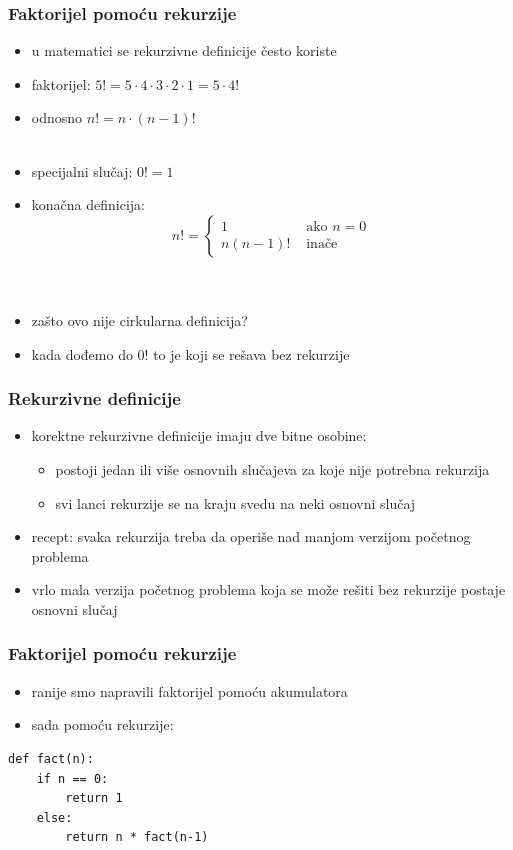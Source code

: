 \documentclass[utf8,compress]{beamer}
\begin{document}
\begin{frame}[fragile]
  \frametitle{Faktorijel pomoću rekurzije}
  \begin{itemize}
    \item u matematici se rekurzivne definicije često koriste
    \item faktorijel: $5! = 5\cdot 4\cdot 3\cdot 2\cdot 1 = 5\cdot 4!$
    \item odnosno $n! = n\cdot (n-1)!$ \\ \ \\
    \item specijalni slučaj: $0! = 1$
    \item konačna definicija: \\
    $$ n! = \left\{
      \begin{array}{rl}
        1 &\mbox{ ako $n=0$} \\
        n(n-1)! &\mbox{ ina\v{c}e}
      \end{array} 
      \right. $$ \\ \ \\
    \item zašto ovo nije cirkularna definicija?
    \item kada dođemo do $0!$ to je  koji se rešava bez rekurzije
  \end{itemize}
\end{frame}

\begin{frame}[fragile]
  \frametitle{Rekurzivne definicije}
  \begin{itemize}
    \item korektne rekurzivne definicije imaju dve bitne osobine:
    \begin{itemize}
      \item postoji jedan ili više osnovnih slučajeva za koje nije potrebna rekurzija
      \item svi lanci rekurzije se na kraju svedu na neki osnovni slučaj
    \end{itemize}
    \item recept: svaka rekurzija treba da operiše nad manjom verzijom početnog problema
    \item vrlo mala verzija početnog problema koja se može rešiti bez rekurzije postaje osnovni slučaj
  \end{itemize}
\end{frame}

\begin{frame}[fragile]
  \frametitle{Faktorijel pomoću rekurzije}
  \begin{itemize}
    \item ranije smo napravili faktorijel pomoću akumulatora
    \item sada pomoću rekurzije:
  \end{itemize}
\begin{verbatim}
def fact(n):
    if n == 0:
        return 1
    else:
        return n * fact(n-1)
\end{verbatim}
\end{frame}
\end{document}
